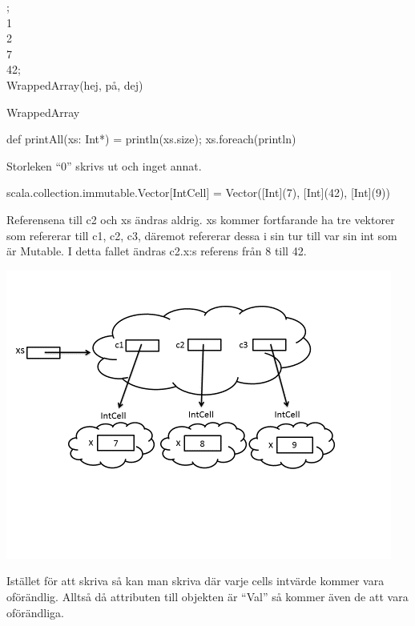 

\ExerciseSolution{\ExeWeekFIVE}


\BasicTasks %

\Task %

;\\
 1\\
 2\\
 7\\
 42;\\
 WrappedArray(hej, på, dej)

\Subtask WrappedArray

\Subtask def printAll(xs: Int*) = {println(xs.size); xs.foreach(println)}  

\Subtask Storleken “0” skrivs ut och inget annat.



\Task %

\Subtask \begin{REPL}
scala.collection.immutable.Vector[IntCell] = 
    Vector([Int](7), [Int](42), [Int](9))
\end{REPL}
Referensena till c2 och xs ändras aldrig. 
xs kommer fortfarande ha tre vektorer som refererar till c1, c2, c3, däremot refererar dessa i sin tur till var sin int som är Mutable. 
I detta fallet ändras c2.x:s referens från 8 till 42.

\Subtask \includegraphics{../img/w05-solutions/memory-pic-1}

\Subtask Istället för att skriva  så kan man skriva  där varje cells intvärde kommer vara oförändlig. 
Alltså då attributen till objekten är “Val” så kommer även de att vara oförändliga. 


